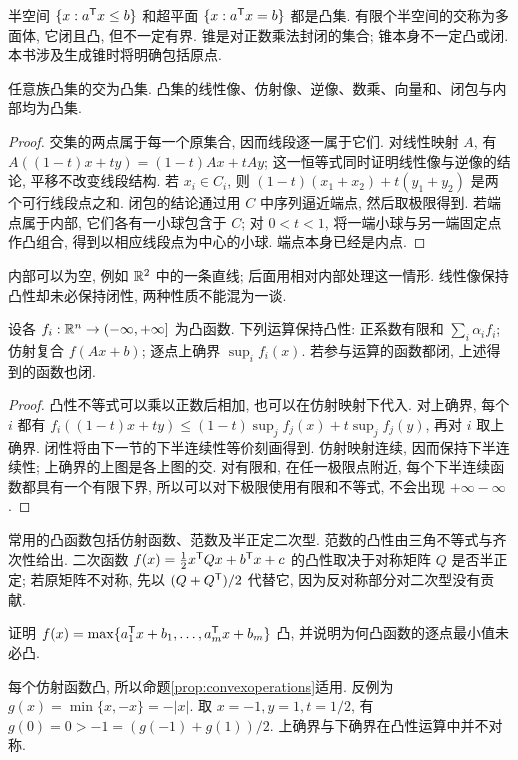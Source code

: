半空间 $\{x:a^{\mathsf T} x\le b\}$ 和超平面 $\{x:a^{\mathsf T} x=b\}$ 都是凸集. 有限个半空间的交称为多面体, 它闭且凸, 但不一定有界. 锥是对正数乘法封闭的集合; 锥本身不一定凸或闭. 本书涉及生成锥时将明确包括原点.

\begin{proposition}
任意族凸集的交为凸集. 凸集的线性像、仿射像、逆像、数乘、向量和、闭包与内部均为凸集.
\end{proposition}
\begin{proof}
交集的两点属于每一个原集合, 因而线段逐一属于它们. 对线性映射 $A$, 有 $A((1-t)x+ty)=(1-t)Ax+tAy$; 这一恒等式同时证明线性像与逆像的结论, 平移不改变线段结构. 若 $x_i\in C_i$, 则 $(1-t)(x_1+x_2)+t(y_1+y_2)$ 是两个可行线段点之和. 闭包的结论通过用 $C$ 中序列逼近端点, 然后取极限得到. 若端点属于内部, 它们各有一小球包含于 $C$; 对 $0<t<1$, 将一端小球与另一端固定点作凸组合, 得到以相应线段点为中心的小球. 端点本身已经是内点.
\end{proof}
内部可以为空, 例如 $\mathbb R^2$ 中的一条直线; 后面用相对内部处理这一情形. 线性像保持凸性却未必保持闭性, 两种性质不能混为一谈.

\begin{proposition}\label{prop:convexoperations}
设各 $f_i:\mathbb R^n\to(-\infty,+\infty]$ 为凸函数. 下列运算保持凸性: 正系数有限和 $\sum_i\alpha_i f_i$; 仿射复合 $f(Ax+b)$; 逐点上确界 $\sup_i f_i(x)$. 若参与运算的函数都闭, 上述得到的函数也闭.
\end{proposition}
\begin{proof}
凸性不等式可以乘以正数后相加, 也可以在仿射映射下代入. 对上确界, 每个 $i$ 都有
$f_i((1-t)x+ty)\le(1-t)\sup_jf_j(x)+t\sup_jf_j(y)$, 再对 $i$ 取上确界. 闭性将由下一节的下半连续性等价刻画得到. 仿射映射连续, 因而保持下半连续性; 上确界的上图是各上图的交. 对有限和, 在任一极限点附近, 每个下半连续函数都具有一个有限下界, 所以可以对下极限使用有限和不等式, 不会出现 $+\infty-\infty$.
\end{proof}
常用的凸函数包括仿射函数、范数及半正定二次型. 范数的凸性由三角不等式与齐次性给出. 二次函数 $f(x)=\tfrac12 x^{\mathsf T} Qx+b^{\mathsf T} x+c$ 的凸性取决于对称矩阵 $Q$ 是否半正定; 若原矩阵不对称, 先以 $(Q+Q^{\mathsf T})/2$ 代替它, 因为反对称部分对二次型没有贡献.

\begin{example}
证明 $f(x)=\max\{a_1^{\mathsf T} x+b_1,\ldots,a_m^{\mathsf T} x+b_m\}$ 凸, 并说明为何凸函数的逐点最小值未必凸.
\end{example}
\begin{solution}
每个仿射函数凸, 所以命题\ref{prop:convexoperations}适用. 反例为 $g(x)=\min\{x,-x\}=-|x|$. 取 $x=-1,y=1,t=1/2$, 有 $g(0)=0>-1=(g(-1)+g(1))/2$. 上确界与下确界在凸性运算中并不对称.
\end{solution}

